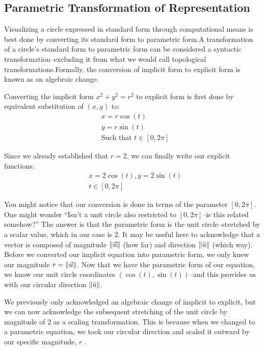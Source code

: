 \documentclass[12pt, letterpaper]{article}
\newcommand{\Lr}{\(r\) }
\newcommand{\xy}{\((x,y)\) }
\begin{document}
	\subsection{Parametric Transformation of Representation}
	Visualizing a circle expressed in standard form through computational means is best done by converting its standard form to parametric form.\ftB A transformation of a circle's standard form to parametric form can be considered a syntactic transformation--excluding it from what we would call topological transformations.\ftD Formally, the conversion of implicit form to explicit form is known as an algebraic change.
	
	Converting the implicit form \(x^{2}+y^{2}=r^{2}\) to explicit form is first done by equivalent substitution of \xy to:
	\begin{equation*}
		\begin{split}
			&x = r\cos(t) \\
			&y = r\sin(t) \\
			&\text{Such that }t \in [0, 2\pi]
		\end{split}
	\end{equation*}
	
	Since we already established that \(r=2\), we can finally write our explicit functions:
	\begin{equation*}
		\begin{split}
			&x = 2\cos(t), y = 2\sin(t) \\
			&t \in [0, 2\pi]
		\end{split}
	\end{equation*}
	
	You might notice that our conversion is done in terms of the parameter \([0,2\pi]\). One might wonder ``Isn't a unit circle also restricted to \([0,2\pi]\)--is this related somehow?'' The answer is that the parametric form is the unit circle--stretched by a scalar value, which in our case is 2. It may be useful here to acknowledge that a vector is composed of magnitude \(\left\lVert\vec{u}\right\rVert\) (how far) and direction \(\left\lVert\hat{u}\right\rVert\) (which way). Before we converted our implicit equation into parametric form, we only knew our magnitude \(r=\left\lVert\vec{u}\right\rVert\). Now that we have the parametric form of our equation, we know our unit circle coordinates \((\cos(t), \sin(t))\)--and this provides us with our circular direction \(\left\lVert\hat{u}\right\rVert\).
	
	We previously only acknowledged an algebraic change of implicit to explicit, but we can now acknowledge the subsequent stretching of the unit circle by magnitude of 2 as a scaling transformation. This is because when we changed to a parametric equation, we took our circular direction and scaled it outward by our specific magnitude, \Lr.
\end{document}
